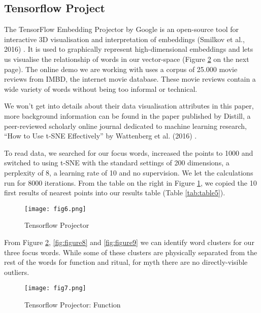 \documentclass[12pt, usenames, dvipsnames]{report}
\begin{document}
\begin{flushleft}
\subsection{Tensorflow Project}

The TensorFlow Embedding Projector by Google is an open-source tool for interactive 3D visualisation and interpretation of embeddings (Smilkov et al., 2016) \cite{smilkov2016}.
It is used to graphically represent high-dimensional embeddings and lets us visualise the relationship of words in our vector-space (Figure \ref{fig:figure7} on the next page).
The online demo we are working with uses a corpus of 25.000 movie reviews from IMBD, the internet movie database.
These movie reviews contain a wide variety of words without being too informal or technical.

We won’t get into details about their data visualisation attributes in this paper, more background information can be found in the paper published by Distill, a peer-reviewed scholarly online journal dedicated to machine learning research, “How to Use t-SNE Effectively” by Wattenberg et al. (2016) \cite{wattenberg2016}.

To read data, we searched for our focus words, increased the points to 1000 and switched to using t-SNE with the standard settings of 200 dimensions, a perplexity of 8, a learning rate of 10 and no supervision.
We let the calculations run for 8000 iterations.
From the table on the right in Figure \ref{fig:figure6}, we copied the 10 first results of nearest points into our results table (Table \ref{tab:table5}).

\vspace*{1.2em}
\begin{figure}[!htbp]
  \hspace*{-3.666em}
  \texttt{[image: fig6.png]}
  \caption{Tensorflow Projector}
  \label{fig:figure6}
\end{figure}
\vspace*{1.2em}

From Figure \ref{fig:figure7}, \ref{fig:figure8} and \ref{fig:figure9} we can identify word clusters for our three focus words.
While some of these clusters are physically separated from the rest of the words for function and ritual, for myth there are no directly-visible outliers.

\vspace*{1.2em}
\begin{figure}[!htbp]
  \hspace*{-3.666em}
  \texttt{[image: fig7.png]}
  \caption{Tensorflow Projector: Function}
  \label{fig:figure7}
\end{figure}
\vspace*{1.2em}


\end{flushleft}
\end{document}
